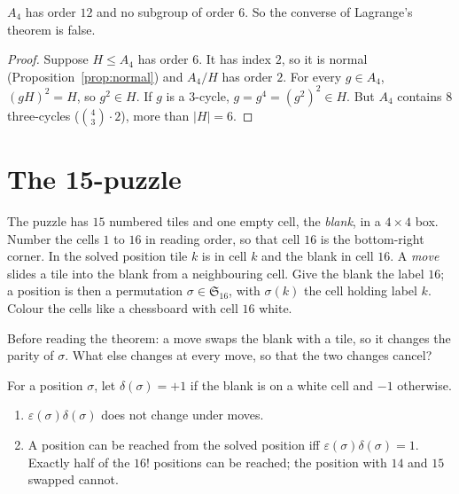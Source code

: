 \begin{proposition}\label{prop:a4}
$A_4$ has order $12$ and no subgroup of order $6$. So the converse of Lagrange's theorem is false.
\end{proposition}
\begin{proof}
Suppose $H\le A_4$ has order $6$. It has index $2$, so it is normal (Proposition~\ref{prop:normal}) and $A_4/H$ has order $2$. For every $g\in A_4$, $(gH)^2=H$, so $g^2\in H$. If $g$ is a $3$-cycle, $g=g^4=(g^2)^2\in H$. But $A_4$ contains $8$ three-cycles ($\binom43\cdot2$), more than $|H|=6$.
\end{proof}

\section{The 15-puzzle}

The puzzle has $15$ numbered tiles and one empty cell, the \emph{blank}, in a $4\times4$ box. Number the cells $1$ to $16$ in reading order, so that cell $16$ is the bottom-right corner. In the solved position tile $k$ is in cell $k$ and the blank in cell $16$. A \emph{move} slides a tile into the blank from a neighbouring cell. Give the blank the label $16$; a position is then a permutation $\sigma\in\mathfrak S_{16}$, with $\sigma(k)$ the cell holding label $k$. Colour the cells like a chessboard with cell $16$ white.

\begin{think}
Before reading the theorem: a move swaps the blank with a tile, so it changes the parity of $\sigma$. What else changes at every move, so that the two changes cancel?
\end{think}

\begin{theorem}\label{thm:fifteen}
For a position $\sigma$, let $\delta(\sigma)=+1$ if the blank is on a white cell and $-1$ otherwise.
\begin{enumerate}[label=(\alph*)]
\item $\varepsilon(\sigma)\delta(\sigma)$ does not change under moves.
\item A position can be reached from the solved position iff $\varepsilon(\sigma)\delta(\sigma)=1$. Exactly half of the $16!$ positions can be reached; the position with $14$ and $15$ swapped cannot.
\end{enumerate}
\end{theorem}

